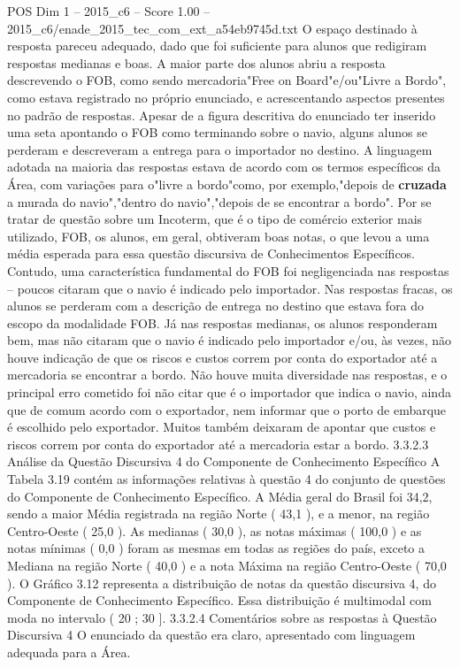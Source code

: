\begin{textsample}{POS Dim 1 – 2015\_c6 – Score 1.00 – 2015\_c6/enade\_2015\_tec\_com\_ext\_a54eb9745d.txt}
O espaço destinado à resposta pareceu adequado, dado que foi suficiente para alunos que redigiram respostas medianas e boas.
A maior parte dos alunos abriu a resposta descrevendo o FOB, como sendo mercadoria"Free on Board"e/ou"Livre a Bordo", como estava registrado no próprio enunciado, e acrescentando aspectos presentes no padrão de respostas.
Apesar de a figura descritiva do enunciado ter inserido uma seta apontando o FOB como terminando sobre o navio, alguns alunos se perderam e descreveram a entrega para o importador no destino.
A linguagem adotada na maioria das respostas estava de acordo com os termos específicos da Área, com variações para o"livre a bordo"como, por exemplo,"depois de \textbf{cruzada} a murada do navio","dentro do navio","depois de se encontrar a bordo".
Por se tratar de questão sobre um Incoterm, que é o tipo de comércio exterior mais utilizado, FOB, os alunos, em geral, obtiveram boas notas, o que levou a uma média esperada para essa questão discursiva de Conhecimentos Específicos.
Contudo, uma característica fundamental do FOB foi negligenciada nas respostas – poucos citaram que o navio é indicado pelo importador.
Nas respostas fracas, os alunos se perderam com a descrição de entrega no destino que estava fora do escopo da modalidade FOB.
Já nas respostas medianas, os alunos responderam bem, mas não citaram que o navio é indicado pelo importador e/ou, às vezes, não houve indicação de que os riscos e custos correm por conta do exportador até a mercadoria se encontrar a bordo.
Não houve muita diversidade nas respostas, e o principal erro cometido foi não citar que é o importador que indica o navio, ainda que de comum acordo com o exportador, nem informar que o porto de embarque é escolhido pelo exportador.
Muitos também deixaram de apontar que custos e riscos correm por conta do exportador até a mercadoria estar a bordo. 3.3.2.3 Análise da Questão Discursiva 4 do Componente de Conhecimento Específico A Tabela 3.19 contém as informações relativas à questão 4 do conjunto de questões do Componente de Conhecimento Específico.
A Média geral do Brasil foi 34,2, sendo a maior Média registrada na região Norte ( 43,1 ), e a menor, na região Centro-Oeste ( 25,0 ).
As medianas ( 30,0 ), as notas máximas ( 100,0 ) e as notas mínimas ( 0,0 ) foram as mesmas em todas as regiões do país, exceto a Mediana na região Norte ( 40,0 ) e a nota Máxima na região Centro-Oeste ( 70,0 ).
O Gráfico 3.12 representa a distribuição de notas da questão discursiva 4, do Componente de Conhecimento Específico.
Essa distribuição é multimodal com moda no intervalo ( 20 ; 30 ]. 3.3.2.4 Comentários sobre as respostas à Questão Discursiva 4 O enunciado da questão era claro, apresentado com linguagem adequada para a Área.

\end{textsample}
